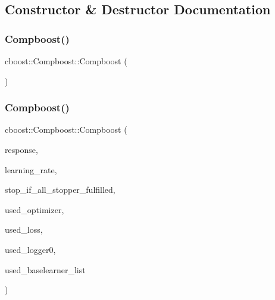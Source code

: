 \subsection{Constructor \& Destructor Documentation}
\mbox{\label{classcboost_1_1_compboost_a5117b7b8cf0a424e736f6833bc5c3a68}} 
\subsubsection{\texorpdfstring{Compboost()}{Compboost()}\hspace{0.1cm}{\footnotesize\ttfamily [1/2]}}
{\footnotesize\ttfamily cboost\+::\+Compboost\+::\+Compboost (\begin{DoxyParamCaption}{ }\end{DoxyParamCaption})}

\mbox{\label{classcboost_1_1_compboost_a24b98d64e9aac2a7a8ec4e64a49a1f7c}} 
\subsubsection{\texorpdfstring{Compboost()}{Compboost()}\hspace{0.1cm}{\footnotesize\ttfamily [2/2]}}
{\footnotesize\ttfamily cboost\+::\+Compboost\+::\+Compboost (\begin{DoxyParamCaption}\item[{const arma\+::vec \&}]{response,  }\item[{const double \&}]{learning\+\_\+rate,  }\item[{const bool \&}]{stop\+\_\+if\+\_\+all\+\_\+stopper\+\_\+fulfilled,  }\item[{\hyperlink{classoptimizer_1_1_optimizer}{optimizer\+::\+Optimizer} $\ast$}]{used\+\_\+optimizer,  }\item[{\hyperlink{classloss_1_1_loss}{loss\+::\+Loss} $\ast$}]{used\+\_\+loss,  }\item[{\hyperlink{classloggerlist_1_1_logger_list}{loggerlist\+::\+Logger\+List} $\ast$}]{used\+\_\+logger0,  }\item[{\hyperlink{classblearnerlist_1_1_baselearner_factory_list}{blearnerlist\+::\+Baselearner\+Factory\+List}}]{used\+\_\+baselearner\+\_\+list }\end{DoxyParamCaption})}

